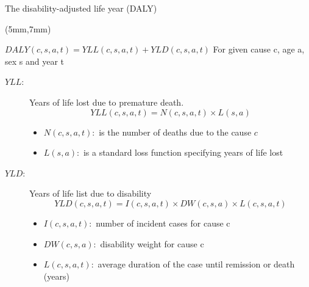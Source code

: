 \begin{frame}{The disability-adjusted life year (DALY)}
    \begin{textblock*}{120mm}(5mm,7mm)
        \begin{graybox}{{$DALY(c,s,a,t) = YLL(c,s,a,t) + YLD(c,s,a,t)$}}
            For given cause c, age a, sex s and year t
            \begin{description}
                \item[$YLL:$] Years of life lost due to premature death.
                    $$
                        YLL(c,s,a,t) = N(c,s,a,t) \times L(s,a)
                    $$
                    \begin{itemize}
                         \item
                             $N(c,s,a,t):$ is the number of 
                             deaths due to the cause $c$ 
                         \item
                             $L(s,a):$ is a standard loss 
                             function specifying years of life lost 
                    \end{itemize}
                 \item[$YLD:$] Years of life list due to disability   
                     $$
                         YLD(c,s,a,t) = I(c,s,a,t) \times DW(c,s,a) 
                         \times L(c,s,a,t)
                     $$
                    \begin{itemize}
                        \item
                            $I(c,s,a,t):$ number of incident cases for cause c
                        \item
                            $DW(c,s,a):$ disability weight for cause c
                        \item
                            $L(c,s,a,t):$  average duration of the case 
                            until remission or death (years)
                    \end{itemize}
            \end{description}
       \end{graybox}        
    \end{textblock*}


\end{frame}
